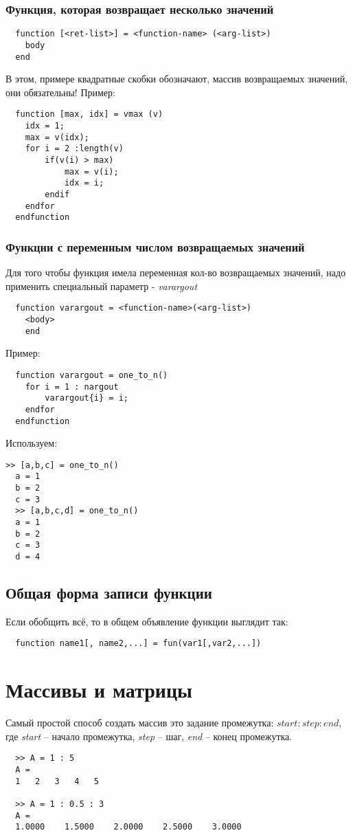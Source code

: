 \documentclass[12pt, a4paper,oneside]{book}
\begin{document}
\subsubsection{Функция, которая возвращает несколько значений}
\begin{lstlisting}
  function [<ret-list>] = <function-name> (<arg-list>)
    body
  end
\end{lstlisting}
В этом, примере квадратные скобки обозначают, массив возвращаемых значений, они обязательны! Пример:
\begin{lstlisting}
  function [max, idx] = vmax (v)
    idx = 1;
    max = v(idx);
    for i = 2 :length(v)
        if(v(i) > max)
            max = v(i);
            idx = i;
        endif
    endfor
  endfunction
\end{lstlisting}

\subsubsection{Функции с переменным числом возвращаемых значений}
Для того чтобы функция имела переменная кол-во возвращаемых значений, надо применить специальный параметр - \textit{varargout}
\begin{lstlisting}
  function varargout = <function-name>(<arg-list>)
    <body>
    end
\end{lstlisting}
Пример:
\begin{lstlisting}
  function varargout = one_to_n()
    for i = 1 : nargout
        varargout{i} = i;
    endfor
  endfunction
\end{lstlisting}
Используем:
\begin{lstlisting}[backgroundcolor=\color{cyan}]
  >> [a,b,c] = one_to_n()
  a = 1
  b = 2
  c = 3
  >> [a,b,c,d] = one_to_n()
  a = 1
  b = 2
  c = 3
  d = 4
\end{lstlisting}
\subsection{Общая форма записи функции}
Если обобщить всё, то в общем объявление функции выглядит так:
\begin{lstlisting}
  function name1[, name2,...] = fun(var1[,var2,...])
\end{lstlisting}

\section{Массивы и матрицы}
Самый простой способ создать массив это задание промежутка: $start : step : end$, где \textit{start} -- начало промежутка, \textit{step} -- шаг, \textit{end} -- конец промежутка.
\begin{lstlisting}
  >> A = 1 : 5
  A =
  1   2   3   4   5

  >> A = 1 : 0.5 : 3
  A =
  1.0000    1.5000    2.0000    2.5000    3.0000
\end{lstlisting}
\end{document}
